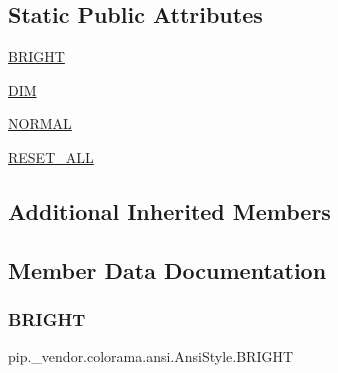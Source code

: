 \subsection*{Static Public Attributes}
\begin{DoxyCompactItemize}
\item 
\hyperlink{classpip_1_1__vendor_1_1colorama_1_1ansi_1_1AnsiStyle_ab25c3a9ec3539b8e324eace08c8e80b4}{B\+R\+I\+G\+HT}
\item 
\hyperlink{classpip_1_1__vendor_1_1colorama_1_1ansi_1_1AnsiStyle_a255e19dfff5bbfdff5b9b57f18747fb5}{D\+IM}
\item 
\hyperlink{classpip_1_1__vendor_1_1colorama_1_1ansi_1_1AnsiStyle_a88d0f48c8b1630d34cb0e38f69dae321}{N\+O\+R\+M\+AL}
\item 
\hyperlink{classpip_1_1__vendor_1_1colorama_1_1ansi_1_1AnsiStyle_adea223938c766d296329a35b7c5f79be}{R\+E\+S\+E\+T\+\_\+\+A\+LL}
\end{DoxyCompactItemize}
\subsection*{Additional Inherited Members}


\subsection{Member Data Documentation}
\mbox{\label{classpip_1_1__vendor_1_1colorama_1_1ansi_1_1AnsiStyle_ab25c3a9ec3539b8e324eace08c8e80b4}} 
\subsubsection{\texorpdfstring{B\+R\+I\+G\+HT}{BRIGHT}}
{\footnotesize\ttfamily pip.\+\_\+vendor.\+colorama.\+ansi.\+Ansi\+Style.\+B\+R\+I\+G\+HT\hspace{0.3cm}{\ttfamily [static]}}

\mbox{\label{classpip_1_1__vendor_1_1colorama_1_1ansi_1_1AnsiStyle_a255e19dfff5bbfdff5b9b57f18747fb5}} 
